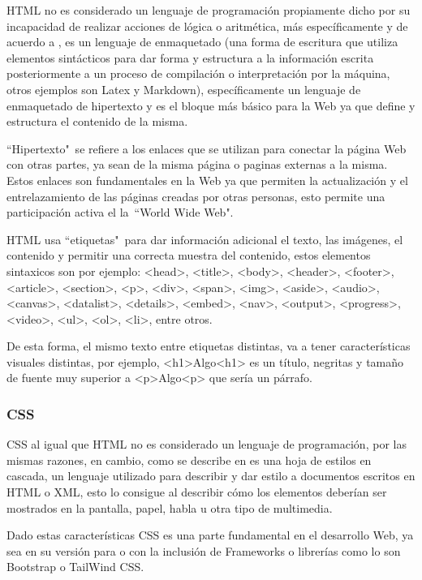 HTML no es considerado un lenguaje de programación propiamente dicho por su
incapacidad de realizar acciones de lógica o aritmética, más específicamente y
de acuerdo a \textcite{HTML},
es un lenguaje de enmaquetado (una forma de escritura que utiliza elementos
sintácticos para dar forma y estructura a la información escrita posteriormente
a un proceso de  compilación o interpretación por la máquina, otros ejemplos son
Latex y Markdown), específicamente un lenguaje de enmaquetado de hipertexto y es
el bloque más básico para la Web ya que define y estructura el contenido de la
misma.

``Hipertexto"\  se refiere a los enlaces que se utilizan para conectar la página
Web con otras partes, ya sean de la misma página o paginas externas a la misma.
Estos enlaces son fundamentales en la Web ya que permiten la actualización y el
entrelazamiento de las páginas creadas por otras personas, esto permite
una participación activa el la\  ``World Wide Web".

HTML usa ``etiquetas"\  para dar información adicional  el texto, las imágenes,
el contenido y permitir
una correcta muestra del contenido, estos elementos sintaxicos son por ejemplo:
 <head>, <title>, <body>, <header>, <footer>, <article>, <section>, <p>, <div>,
 <span>, <img>, <aside>, <audio>, <canvas>, <datalist>, <details>, <embed>,
 <nav>, <output>, <progress>, <video>, <ul>, <ol>, <li>, entre otros.

 De esta forma, el mismo texto entre etiquetas distintas, va a tener características
 visuales distintas, por ejemplo, <h1>Algo<h1> es un título, negritas y tamaño de
 fuente muy superior a <p>Algo<p> que sería un párrafo.


\subsubsection{CSS}

CSS al igual que HTML no es considerado un lenguaje de programación, por las mismas
razones, en cambio, como se describe en \textcite{CSS} es una hoja de estilos en cascada,
un lenguaje utilizado para describir y dar estilo a documentos escritos en HTML o
XML, esto lo consigue al describir cómo los elementos deberían ser mostrados en la
pantalla, papel, habla u otra tipo de multimedia.

Dado estas características CSS es una parte fundamental en el desarrollo Web, ya
sea en su versión para o con la inclusión de Frameworks o librerías como lo son
Bootstrap o TailWind CSS.


